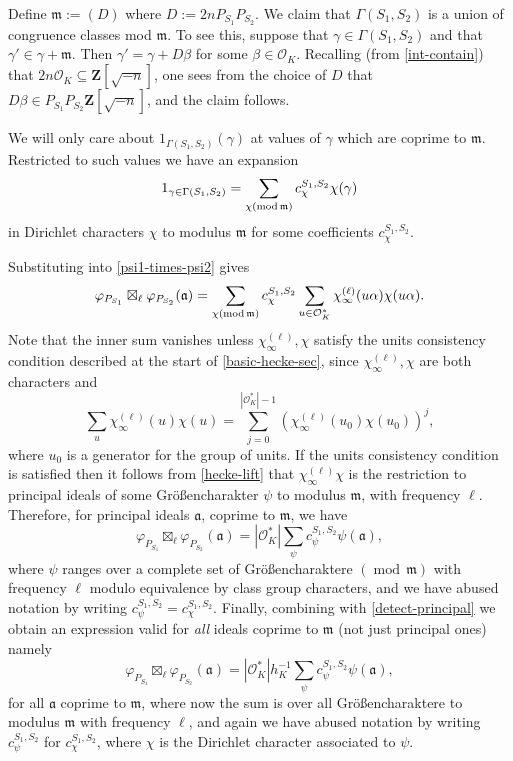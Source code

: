 \documentclass[11pt,reqno]{amsart}
\numberwithin{equation}{section}
\theoremstyle{definition}
\theoremstyle{remark}
\newcommand{\mf}{\mathfrak}
\newcommand\Z{\mathbf{Z}}
\newcommand{\md}[1]{\ensuremath{(\operatorname{mod}\, #1)}}
\newcommand{\mdsub}[1]{\ensuremath{(\mbox{\scriptsize mod}\, #1)}}
\renewcommand\O{\mathcal{O}}
\begin{document}
Define $\mf{m} := (D)$ where $D := 2nP_{S_1} P_{S_2}$. We claim that $\Gamma(S_1, S_2)$ is a union of congruence classes mod $\mf{m}$. To see this, suppose that $\gamma \in \Gamma(S_1, S_2)$ and that $\gamma' \in \gamma + \mf{m}$. Then $\gamma' = \gamma + D \beta$ for some $\beta \in \O_K$. Recalling (from \cref{int-contain}) that $2n \O_K \subseteq\Z[\sqrt{-n}]$, one sees from the choice of $D$ that $D \beta \in P_{S_1}P_{S_2} \Z[\sqrt{-n}]$, and the claim follows. 

We will only care about $1_{\Gamma(S_1, S_2)}(\gamma)$ at values of $\gamma$ which are coprime to $\mf{m}$. Restricted to such values we have an expansion 
 \begin{equation}\label{r-to-dirichlet} 1_{\gamma \in \Gamma(S_1, S_2)} = \sum_{\chi \mdsub{\mf{m}}} c^{S_1, S_2}_{\chi} \chi(\gamma)\end{equation} in Dirichlet characters $\chi$ to modulus $\mf{m}$ for some coefficients $c^{S_1, S_2}_{\chi}$.

 Substituting into \cref{psi1-times-psi2} gives
 \[\varphi_{P_{S_1}} \boxtimes_{\ell} \varphi_{P_{S_2}}(\mf{a}) =  \sum_{\chi \mdsub{\mf{m}}} c^{S_1,S_2}_{\chi} \sum_{u \in \O_K^*} \chi_{\infty}^{(\ell)}(u \alpha) \chi(u\alpha).  \]
 Note that the inner sum vanishes unless $\chi_{\infty}^{(\ell)}, \chi$ satisfy the units consistency condition described at the start of \cref{basic-hecke-sec}, since $\chi_{\infty}^{(\ell)}, \chi$ are both characters and \[ \sum_u \chi_{\infty}^{(\ell)}(u) \chi(u) = \sum_{j = 0}^{|\O^*_K| - 1} (\chi_{\infty}^{(\ell)}(u_0)\chi(u_0))^j,\] where $u_0$ is a generator for the group of units. If the units consistency condition is satisfied then it follows from \cref{hecke-lift} that $\chi_{\infty}^{(\ell)}\chi$ is the restriction to principal ideals of some Gr\"o{\ss}encharakter $\psi$ to modulus $\mf{m}$, with frequency $\ell$. Therefore, for principal ideals $\mf{a}$, coprime to $\mf{m}$, we have
\begin{equation}\label{coords-in-chars-2} 
 \varphi_{P_{S_1}} \boxtimes_{\ell} \varphi_{P_{S_2}}(\mf{a}) =  |\O^*_K| \sum_{\psi}  c^{S_1,S_2}_{\psi} \psi(\mf{a}),\end{equation} where $\psi$ ranges over a complete set of Gr\"o{\ss}encharaktere $\md{\mf{m}}$ with frequency $\ell$ modulo equivalence by class group characters, and we have abused notation by writing $c^{S_1,S_2}_{\psi} = c^{S_1,S_2}_{\chi}$. Finally, combining with \cref{detect-principal} we obtain an expression valid for \emph{all} ideals coprime to $\mf{m}$ (not just principal ones) namely
\begin{equation} \label{cutoff-in-Heckes}  \varphi_{P_{S_1}} \boxtimes_{\ell} \varphi_{P_{S_2}}(\mf{a}) =  |\O^*_K| h_K^{-1} \sum_{\psi} c^{S_1,S_2}_{\psi} \psi(\mf{a}),\end{equation}for all $\mf{a}$ coprime to $\mf{m}$, where now the sum is over all Gr\"o{\ss}encharaktere to modulus $\mf{m}$ with frequency $\ell$, and again we have abused notation by writing $c^{S_1,S_2}_{\psi}$ for $c^{S_1,S_2}_{\chi}$, where $\chi$ is the Dirichlet character associated to $\psi$.
\end{document}
